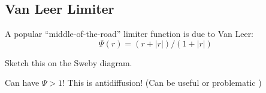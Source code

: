 \subsection{Van Leer Limiter}

A popular ``middle-of-the-road'' limiter function is due to Van Leer:
\begin{equation*}
\Psi(r) = (r+|r|)/(1+|r|)
\end{equation*}

 Sketch this on the Sweby diagram.

 Can have $\Psi>1$! This is antidiffusion! (Can be useful or problematic )   
